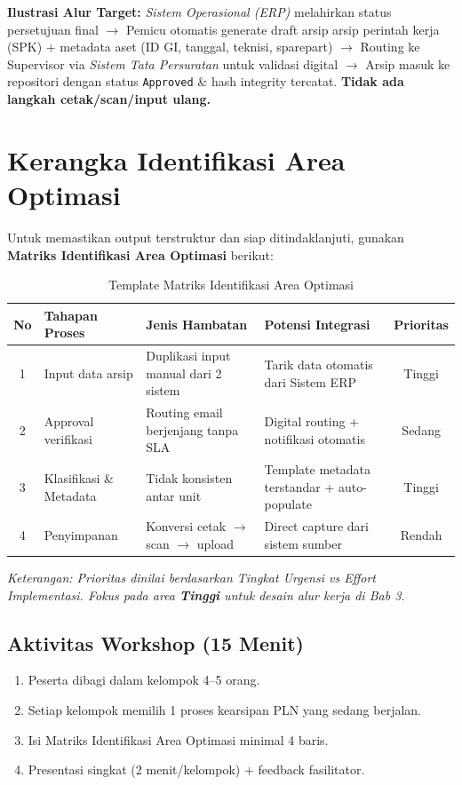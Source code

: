 \documentclass[12pt,a4paper]{report}
\begin{document}
\begin{plnbox}
\textbf{Ilustrasi Alur Target:} \textit{Sistem Operasional (ERP)} melahirkan status persetujuan final $\rightarrow$ Pemicu otomatis generate draft arsip arsip perintah kerja (SPK) + metadata aset (ID GI, tanggal, teknisi, sparepart) $\rightarrow$ Routing ke Supervisor via \textit{Sistem Tata Persuratan} untuk validasi digital $\rightarrow$ Arsip masuk ke repositori dengan status \texttt{Approved} \& hash integrity tercatat. \textbf{Tidak ada langkah cetak/scan/input ulang.}
\end{plnbox}

\section{Kerangka Identifikasi Area Optimasi}
Untuk memastikan output terstruktur dan siap ditindaklanjuti, gunakan \textbf{Matriks Identifikasi Area Optimasi} berikut:

\begin{table}[htbp]
\centering
\small
\caption{Template Matriks Identifikasi Area Optimasi}
\begin{tabularx}{\textwidth}{@{} c X X X c @{}}
\toprule
\textbf{No} & \textbf{Tahapan Proses} & \textbf{Jenis Hambatan} & \textbf{Potensi Integrasi} & \textbf{Prioritas} \\
\midrule
1 & Input data arsip & Duplikasi input manual dari 2 sistem & Tarik data otomatis dari Sistem ERP & Tinggi \\
2 & Approval verifikasi & Routing email berjenjang tanpa SLA & Digital routing + notifikasi otomatis & Sedang \\
3 & Klasifikasi \& Metadata & Tidak konsisten antar unit & Template metadata terstandar + auto-populate & Tinggi \\
4 & Penyimpanan & Konversi cetak $\rightarrow$ scan $\rightarrow$ upload & Direct capture dari sistem sumber & Rendah \\
\bottomrule
\end{tabularx}
\end{table}
\textit{Keterangan: Prioritas dinilai berdasarkan Tingkat Urgensi vs Effort Implementasi. Fokus pada area \textbf{Tinggi} untuk desain alur kerja di Bab 3.}

\subsection*{Aktivitas Workshop (15 Menit)}
\begin{enumerate}[leftmargin=*]
    \item Peserta dibagi dalam kelompok 4--5 orang.
    \item Setiap kelompok memilih 1 proses kearsipan PLN yang sedang berjalan.
    \item Isi Matriks Identifikasi Area Optimasi minimal 4 baris.
    \item Presentasi singkat (2 menit/kelompok) + feedback fasilitator.
\end{enumerate}
\end{document}
